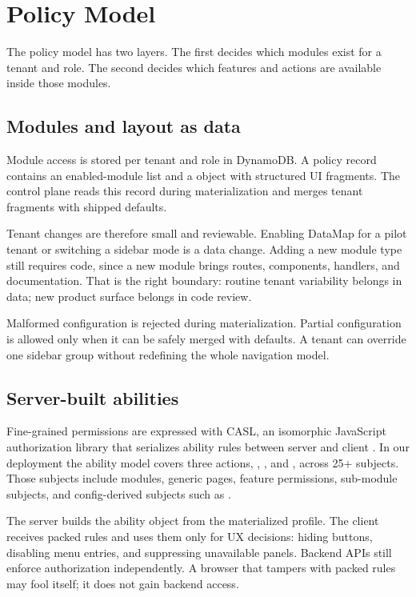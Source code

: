\section{Policy Model}
\label{sec:policy_model}

The policy model has two layers. The first decides which modules exist for a tenant and role. The second decides which features and actions are available inside those modules.

\subsection{Modules and layout as data}
\label{sec:module_policy}

Module access is stored per tenant and role in DynamoDB. A policy record contains an enabled-module list and a  object with structured UI fragments. The control plane reads this record during  materialization and merges tenant fragments with shipped defaults.

Tenant changes are therefore small and reviewable. Enabling DataMap for a pilot tenant or switching a sidebar mode is a data change. Adding a new module type still requires code, since a new module brings routes, components, handlers, and documentation. That is the right boundary: routine tenant variability belongs in data; new product surface belongs in code review.

Malformed configuration is rejected during materialization. Partial configuration is allowed only when it can be safely merged with defaults. A tenant can override one sidebar group without redefining the whole navigation model.

\subsection{Server-built abilities}
\label{sec:abilities}

Fine-grained permissions are expressed with CASL, an isomorphic JavaScript authorization library that serializes ability rules between server and client \cite{casl_docs}. In our deployment the ability model covers three actions, , , and , across 25+ subjects. Those subjects include modules, generic pages, feature permissions, sub-module subjects, and config-derived subjects such as .

The server builds the ability object from the materialized profile. The client receives packed rules and uses them only for UX decisions: hiding buttons, disabling menu entries, and suppressing unavailable panels. Backend APIs still enforce authorization independently. A browser that tampers with packed rules may fool itself; it does not gain backend access.

